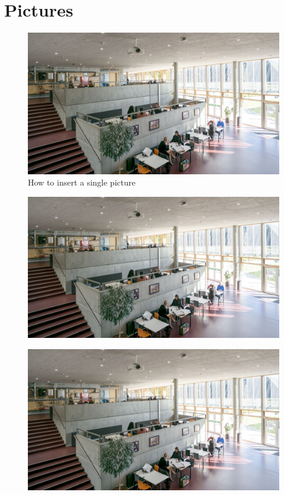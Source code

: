 \section{Pictures}

\begin{figure}[H]
    \centering
    \includegraphics[width=\textwidth]{figures/Chapter1/ucn_exmaple.jpg}
    \caption{How to insert a single picture}
    \label{fig:campus}
\end{figure}

\begin{figure}[H]
\centering
\begin{minipage}{.5\textwidth}
  \centering
  \includegraphics[width=0.9\linewidth]{figures/Chapter1/ucn_exmaple.jpg}
  \label{fig:test1}
\end{minipage}%
\begin{minipage}{.5\textwidth}
  \centering
  \includegraphics[width=0.9\linewidth]{figures/Chapter1/ucn_exmaple.jpg}
  \label{fig:test2}
\end{minipage}
\end{figure}